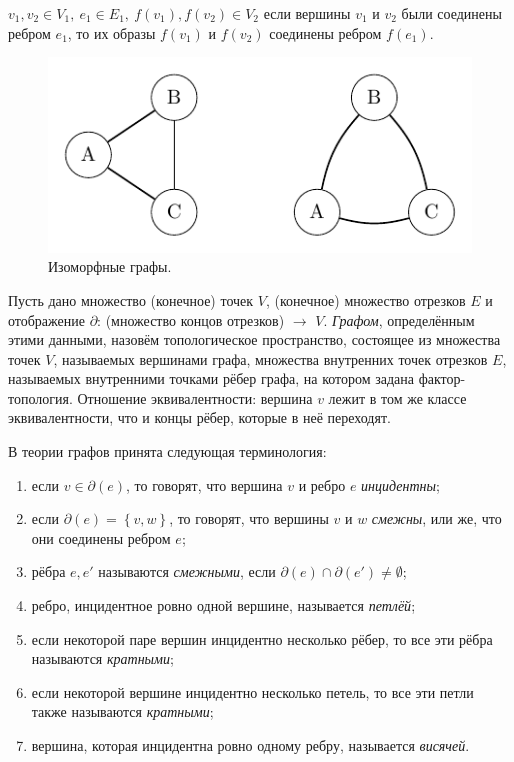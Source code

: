 $v_1, v_2 \in V_1, \ e_1 \in E_1, \ f(v_1), f(v_2) \in V_2$ если вершины $v_1$ и $v_2$ были соединены ребром $e_1$, то их образы $f(v_1)$ и $f(v_2)$ соединены ребром $f(e_1)$.

\begin{figure}[h]
    \centering
    \includegraphics{images/c3.2.pdf}
    \caption{Изоморфные графы.}
    \label{fig:c3.2}
\end{figure}

\begin{definition}
    Пусть дано множество (конечное) точек $V$, (конечное) множество отрезков $E$ и отображение $\partial$: (множество концов отрезков) $\to$ $V$. \textit{Графом}, определённым этими данными, назовём топологическое пространство, состоящее из множества точек $V$, называемых вершинами графа, множества внутренних точек отрезков $E$, называемых внутренними точками рёбер графа, на котором задана фактор-топология. Отношение эквивалентности: вершина $v$ лежит в том же классе эквивалентности, что и концы рёбер, которые в неё переходят.
\end{definition}

В теории графов принята следующая терминология:
\begin{enumerate}
    \item если $v \in \partial(e)$, то говорят, что вершина $v$ и ребро $e$ \textit{инцидентны};
    \item если $\partial(e) = \left\{v,w\right\}$, то говорят, что вершины $v$ и $w$ \textit{смежны}, или же, что они соединены ребром $e$;
    \item рёбра $e, e'$ называются \textit{смежными}, если $\partial(e) \cap \partial(e') \neq \emptyset$;
    \item ребро, инцидентное ровно одной вершине, называется \textit{петлёй};
    \item если некоторой паре вершин инцидентно несколько рёбер, то все эти рёбра называются \textit{кратными};
    \item если некоторой вершине инцидентно несколько петель, то все эти петли также называются \textit{кратными};
    \item вершина, которая инцидентна ровно одному ребру, называется \textit{висячей}.
\end{enumerate}


